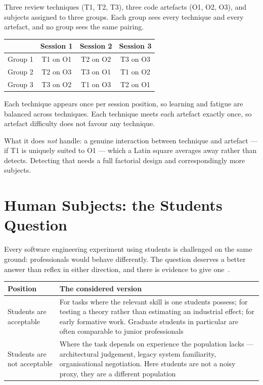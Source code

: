 \begin{worked}
Three review techniques (T1, T2, T3), three code artefacts (O1, O2, O3), and
subjects assigned to three groups. Each group sees every technique and every
artefact, and no group sees the same pairing.

\medskip
\begin{center}
\small
\begin{tabular}{@{}L{2.4cm}ccc@{}}
\toprule
 & \textbf{Session 1} & \textbf{Session 2} & \textbf{Session 3} \\
\midrule
Group 1 & T1 on O1 & T2 on O2 & T3 on O3 \\
Group 2 & T2 on O3 & T3 on O1 & T1 on O2 \\
Group 3 & T3 on O2 & T1 on O3 & T2 on O1 \\
\bottomrule
\end{tabular}
\end{center}

\medskip
Each technique appears once per session position, so learning and fatigue are
balanced across techniques. Each technique meets each artefact exactly once, so
artefact difficulty does not favour any technique.

\medskip
What it does \emph{not} handle: a genuine interaction between technique and
artefact --- if T1 is uniquely suited to O1 --- which a Latin square averages
away rather than detects. Detecting that needs a full factorial design and
correspondingly more subjects.
\end{worked}

\section{Human Subjects: the Students Question}

Every software engineering experiment using students is challenged on the same
ground: professionals would behave differently. The question deserves a better
answer than reflex in either direction, and there is evidence to give
one~\cite{falessi2018empirical, sjoberg2005survey}.

\begin{center}
\small
\begin{tabular}{@{}L{4.4cm}L{9.9cm}@{}}
\toprule
\textbf{Position} & \textbf{The considered version} \\
\midrule
Students are acceptable
  & For tasks where the relevant skill is one students possess; for testing a
    theory rather than estimating an industrial effect; for early formative
    work. Graduate students in particular are often comparable to junior
    professionals \\
Students are not acceptable
  & Where the task depends on experience the population lacks --- architectural
    judgement, legacy system familiarity, organisational negotiation. Here
    students are not a noisy proxy, they are a different population \\
\bottomrule
\end{tabular}
\end{center}

